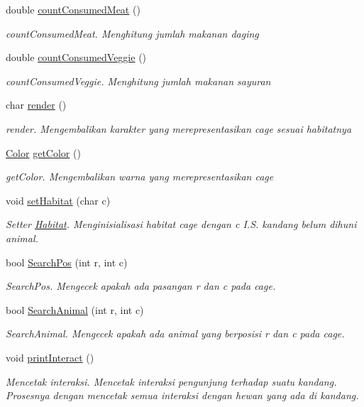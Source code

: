 \begin{DoxyCompactItemize}
double \hyperlink{classCage_a4acb30ffa8df06db080019ecf35824a2}{count\+Consumed\+Meat} ()
\begin{DoxyCompactList}\small\item\em count\+Consumed\+Meat. Menghitung jumlah makanan daging \end{DoxyCompactList}\item 
double \hyperlink{classCage_a57c2ea58b99c5990bdf9f712841c0334}{count\+Consumed\+Veggie} ()
\begin{DoxyCompactList}\small\item\em count\+Consumed\+Veggie. Menghitung jumlah makanan sayuran \end{DoxyCompactList}\item 
char \hyperlink{classCage_aab864d541ada79ac83619b139bef5507}{render} ()
\begin{DoxyCompactList}\small\item\em render. Mengembalikan karakter yang merepresentasikan cage sesuai habitatnya \end{DoxyCompactList}\item 
\hyperlink{color_8h_ab87bacfdad76e61b9412d7124be44c1c}{Color} \hyperlink{classCage_a95f3b253744419722bf5ccbda06faf62}{get\+Color} ()
\begin{DoxyCompactList}\small\item\em get\+Color. Mengembalikan warna yang merepresentasikan cage \end{DoxyCompactList}\item 
void \hyperlink{classCage_ab879106b3284eef081bb14096db7c9aa}{set\+Habitat} (char c)
\begin{DoxyCompactList}\small\item\em Setter \hyperlink{classHabitat}{Habitat}. Menginisialisasi habitat cage dengan c I.\+S. kandang belum dihuni animal. \end{DoxyCompactList}\item 
bool \hyperlink{classCage_a128e52e1da32a761113545f84a82c163}{Search\+Pos} (int r, int c)
\begin{DoxyCompactList}\small\item\em Search\+Pos. Mengecek apakah ada pasangan r dan c pada cage. \end{DoxyCompactList}\item 
bool \hyperlink{classCage_a75988c8f55ed212612c012ba94b8815e}{Search\+Animal} (int r, int c)
\begin{DoxyCompactList}\small\item\em Search\+Animal. Mengecek apakah ada animal yang berposisi r dan c pada cage. \end{DoxyCompactList}\item 
void \hyperlink{classCage_a10346b885c28f4d8cc0d3d4e5a0ca5c9}{print\+Interact} ()
\begin{DoxyCompactList}\small\item\em Mencetak interaksi. Mencetak interaksi pengunjung terhadap suatu kandang. Prosesnya dengan mencetak semua interaksi dengan hewan yang ada di kandang. \end{DoxyCompactList}\end{DoxyCompactItemize}
